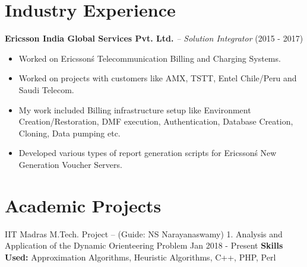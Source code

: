 \documentclass[11pt,a4paper,sans]{moderncv}        %
\begin{document}
\section{Industry Experience} 
\textbf{Ericsson India Global Services Pvt. Ltd.}  
\textit {-- Solution Integrator} (2015 - 2017) 
\begin{itemize}
\item Worked on  Ericsson\'{s} Telecommunication Billing and Charging Systems.
\item  Worked on projects with customers like AMX, TSTT, Entel Chile/Peru and Saudi Telecom.
\item  My work included Billing infrastructure setup like Environment Creation/Restoration, DMF execution, Authentication, Database Creation, Cloning, Data pumping etc.
\item Developed various types of report generation scripts for Ericsson\'{s}  New Generation Voucher Servers.
\end{itemize}


\section{Academic Projects}
\cventry
{IIT Madras}
{M.Tech. Project -- (Guide: NS Narayanaswamy)}
{1. Analysis and Application of the Dynamic Orienteering Problem}
{Jan 2018 - Present}{}{}{}
\textbf{Skills Used:} Approximation Algorithms, Heuristic Algorithms, C++, PHP, Perl \\

\end{document}
